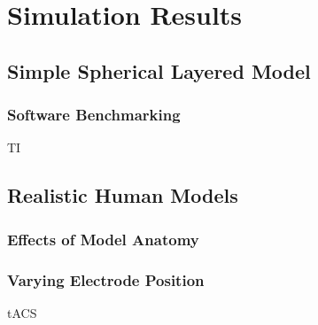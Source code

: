 \pagebreak
\chapter{Simulation Results}


\section{Simple Spherical Layered Model}
\subsection{Software Benchmarking}
\gls{TI}
\cite{Grossman2017}
\cite{Hsu2019}
\cite{Rampersad2019}

\section{Realistic Human Models}
\subsection{Effects of Model Anatomy}
\subsection{Varying Electrode Position}
\gls{tACS}
\cite{ITstissue}
\cite{Lee2016}
\cite{Lee2018}
\cite{ErikG.Lee2016}
